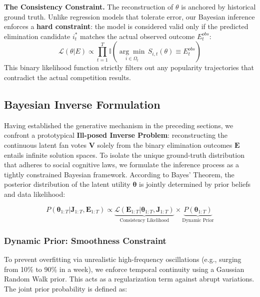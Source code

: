 \documentclass{mcmthesis}
\begin{document}
\noindent \textbf{The Consistency Constraint.}
The reconstruction of $\theta$ is anchored by historical ground truth. Unlike regression models that tolerate error, our Bayesian inference enforces a \textbf{hard constraint}: the model is considered valid only if the predicted elimination candidate $i^*_t$ matches the actual observed outcome $E_t^{obs}$:
\begin{equation}
	\mathcal{L}(\theta | E) \propto \prod_{t=1}^T \mathbb{I}\left( \underset{i \in \Omega_t}{\arg\min} \, S_{i,t}(\theta) \equiv E_t^{obs} \right)
	\label{eq:inverse_constraint}
\end{equation}
This binary likelihood function strictly filters out any popularity trajectories that contradict the actual competition results.

\subsection{Bayesian Inverse Formulation}

Having established the generative mechanism in the preceding sections, we confront a prototypical \textbf{Ill-posed Inverse Problem}: reconstructing the continuous latent fan votes $\mathbf{V}$ solely from the binary elimination outcomes $\mathbf{E}$ entails infinite solution spaces. To isolate the unique ground-truth distribution that adheres to social cognitive laws, we formulate the inference process as a tightly constrained Bayesian framework. According to Bayes' Theorem, the posterior distribution of the latent utility $\boldsymbol{\theta}$ is jointly determined by prior beliefs and data likelihood:

\begin{equation}
	P(\boldsymbol{\theta}_{1:T} | \mathbf{J}_{1:T}, \mathbf{E}_{1:T}) \propto \underbrace{\mathcal{L}(\mathbf{E}_{1:T} | \boldsymbol{\theta}_{1:T}, \mathbf{J}_{1:T})}_{\text{Consistency Likelihood}} \times \underbrace{P(\boldsymbol{\theta}_{1:T})}_{\text{Dynamic Prior}}
	\label{eq:bayes_framework}
\end{equation}

\subsubsection{Dynamic Prior: Smoothness Constraint}
To prevent overfitting via unrealistic high-frequency oscillations (e.g., surging from 10\% to 90\% in a week), we enforce temporal continuity using a Gaussian Random Walk prior. This acts as a regularization term against abrupt variations. The joint prior probability is defined as:
\end{document}
